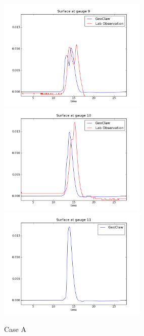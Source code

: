 \begin{figure}[ht]
\hfil\includegraphics[width=2.8in]{bp5/CaseA/gauge0009fig300.png}\hfil
\vskip 5pt
\hfil\includegraphics[width=2.8in]{bp5/CaseA/gauge0010fig300.png}\hfil
\hfil\includegraphics[width=2.8in]{bp5/CaseA/gauge0011fig300.png}\hfil
\caption{\label{fig:bp5A} Case A }
\end{figure}

